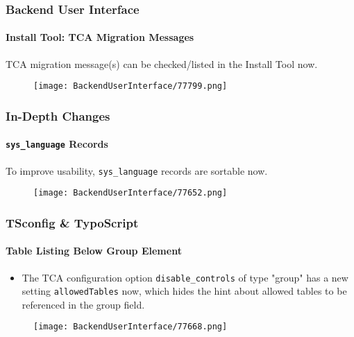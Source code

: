 \begin{frame}[fragile]
	\frametitle{Backend User Interface}
	\framesubtitle{Install Tool: TCA Migration Messages}

	TCA migration message(s) can be checked/listed in the Install Tool now.

	\begin{figure}
		\texttt{[image: BackendUserInterface/77799.png]}
	\end{figure}

\end{frame}


\begin{frame}[fragile]
	\frametitle{In-Depth Changes}
	\framesubtitle{\texttt{sys\_language} Records}

	To improve usability, \texttt{sys\_language} records are sortable now.

	\begin{figure}
		\texttt{[image: BackendUserInterface/77652.png]}
	\end{figure}

\end{frame}


\begin{frame}[fragile]
	\frametitle{TSconfig \& TypoScript}
	\framesubtitle{Table Listing Below Group Element}

	\begin{itemize}

		\item The TCA configuration option \texttt{disable\_controls} of type "group"
			has a new setting \texttt{allowedTables} now, which hides the hint about
			allowed tables to be referenced in the group field.

	\end{itemize}

	\begin{figure}
		\texttt{[image: BackendUserInterface/77668.png]}
	\end{figure}

\end{frame}


